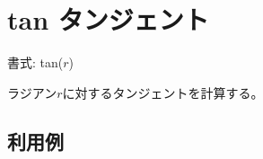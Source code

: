 
%

\section{tan タンジェント\label{sect:tan}}

書式: tan($r$)

ラジアン$r$に対するタンジェントを計算する。

\subsection*{利用例}


%

